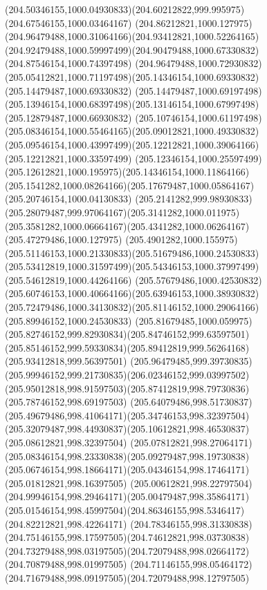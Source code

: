 {{		\curveto(204.50346155,1000.04930833)(204.60212822,999.995975)(204.67546155,1000.03464167)
		\curveto(204.86212821,1000.127975)(204.96479488,1000.31064166)(204.93412821,1000.52264165)
		\curveto(204.92479488,1000.59997499)(204.90479488,1000.67330832)(204.87546154,1000.74397498)
		\curveto(204.96479488,1000.72930832)(205.05412821,1000.71197498)(205.14346154,1000.69330832)
		\lineto(205.14479487,1000.69330832)
		\lineto(205.14479487,1000.69197498)
		\curveto(205.13946154,1000.68397498)(205.13146154,1000.67997498)(205.12879487,1000.66930832)
		\curveto(205.10746154,1000.61197498)(205.08346154,1000.55464165)(205.09012821,1000.49330832)
		\curveto(205.09546154,1000.43997499)(205.12212821,1000.39064166)(205.12212821,1000.33597499)
		\curveto(205.12346154,1000.25597499)(205.12612821,1000.195975)(205.14346154,1000.11864166)
		\curveto(205.1541282,1000.08264166)(205.17679487,1000.05864167)(205.20746154,1000.04130833)
		\curveto(205.2141282,999.98930833)(205.28079487,999.97064167)(205.3141282,1000.011975)
		\curveto(205.3581282,1000.06664167)(205.4341282,1000.06264167)(205.47279486,1000.127975)
		\curveto(205.4901282,1000.155975)(205.51146153,1000.21330833)(205.51679486,1000.24530833)
		\curveto(205.53412819,1000.31597499)(205.54346153,1000.37997499)(205.54612819,1000.44264166)
		\curveto(205.57679486,1000.42530832)(205.60746153,1000.40664166)(205.63946153,1000.38930832)
		\curveto(205.72479486,1000.34130832)(205.81146152,1000.29064166)(205.89946152,1000.24530833)
		\curveto(205.81679485,1000.059975)(205.82746152,999.82930834)(205.84746152,999.63597501)
		\curveto(205.85146152,999.59330834)(205.89412819,999.56264168)(205.93412818,999.56397501)
		\curveto(205.96479485,999.39730835)(205.99946152,999.21730835)(206.02346152,999.03997502)
		\curveto(205.95012818,998.91597503)(205.87412819,998.79730836)(205.78746152,998.69197503)
		\curveto(205.64079486,998.51730837)(205.49679486,998.41064171)(205.34746153,998.32397504)
		\curveto(205.32079487,998.44930837)(205.10612821,998.46530837)(205.08612821,998.32397504)
		\curveto(205.07812821,998.27064171)(205.08346154,998.23330838)(205.09279487,998.19730838)
		\curveto(205.06746154,998.18664171)(205.04346154,998.17464171)(205.01812821,998.16397505)
		\curveto(205.00612821,998.22797504)(204.99946154,998.29464171)(205.00479487,998.35864171)
		\curveto(205.01546154,998.45997504)(204.86346155,998.5346417)(204.82212821,998.42264171)
		\curveto(204.78346155,998.31330838)(204.75146155,998.17597505)(204.74612821,998.03730838)
		\curveto(204.73279488,998.03197505)(204.72079488,998.02664172)(204.70879488,998.01997505)
		\curveto(204.71146155,998.05464172)(204.71679488,998.09197505)(204.72079488,998.12797505)
}}
